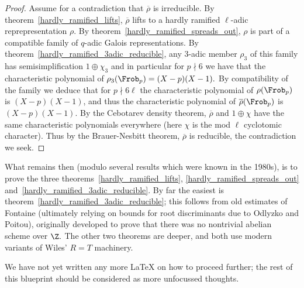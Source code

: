 \begin{proof}
  Assume for a contradiction that $\overline{\rho}$ is irreducible. By theorem~\ref{hardly_ramified_lifts},
  $\overline{\rho}$ lifts to a hardly ramified $\ell$-adic reprepresentation $\rho$. By
  theorem~\ref{hardly_ramified_spreads_out}, $\rho$ is part of a compatible family of
  $q$-adic Galois representations. By theorem~\ref{hardly_ramified_3adic_reducible},
  any 3-adic member $\rho_3$ of this family has semisimplification $1\oplus\chi_3$ and in particular
  for $p\nmid 6$ we have that the characteristic polynomial of $\rho_3(\Frob_p)=(X-p)(X-1).$
  By compatibility of the family we deduce that for $p\nmid 6\ell$ the characteristic
  polynomial of $\rho(\Frob_p)$ is $(X-p)(X-1)$, and thus the characteristic polynomial
  of $\overline{\rho}(\Frob_p)$ is $(X-p)(X-1)$. By the Cebotarev density theorem,
  $\overline{\rho}$ and $1\oplus\chi$ have the same characteristic polynomials everywhere
  (here $\chi$ is the mod $\ell$ cyclotomic character). Thus by the Brauer-Nesbitt theorem,
  $\overline{\rho}$ is reducible, the contradiction we seek.
\end{proof}

What remains then (modulo several results which were known in the 1980s),
is to prove the three theorems~\ref{hardly_ramified_lifts},
\ref{hardly_ramified_spreads_out} and~\ref{hardly_ramified_3adic_reducible}.
By far the easiest is theorem~\ref{hardly_ramified_3adic_reducible}; this follows
from old estimates of Fontaine (ultimately relying on bounds for root discriminants due to
Odlyzko and Poitou), originally developed to prove that there was no
nontrivial abelian scheme over $\Z.$ The other two theorems are deeper, and both use
modern variants of Wiles' $R=T$ machinery.

We have not yet written any more LaTeX on how to proceed further; the rest of
this blueprint should be considered as more unfocussed thoughts.
